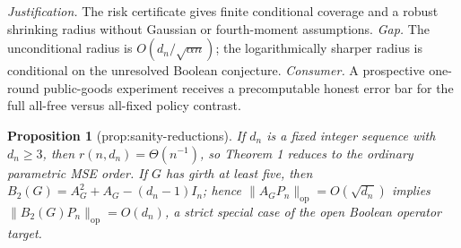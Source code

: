 \documentclass{article}
\newtheorem{proposition}{Proposition}
\begin{document}
\par\smallskip\noindent \textit{Justification.} The risk certificate gives finite conditional coverage and a robust shrinking radius without Gaussian or fourth-moment assumptions. \textit{Gap.} The unconditional radius is \(O(d_n/\sqrt{\alpha n})\); the logarithmically sharper radius is conditional on the unresolved Boolean conjecture. \textit{Consumer.} A prospective one-round public-goods experiment receives a precomputable honest error bar for the full all-free versus all-fixed policy contrast.

\begin{proposition}[prop:sanity-reductions]\label{prop:sanity-reductions}
If \(d_n\) is a fixed integer sequence with \(d_n\ge3\), then \(r(n,d_n)=\Theta(n^{-1})\), so Theorem 1 reduces to the ordinary parametric MSE order. If \(G\) has girth at least five, then \(B_2(G)=A_G^2+A_G-(d_n-1)I_n\); hence \(\|A_GP_n\|_{\mathrm{op}}=O(\sqrt{d_n})\) implies \(\|B_2(G)P_n\|_{\mathrm{op}}=O(d_n)\), a strict special case of the open Boolean operator target.
\end{proposition}
\end{document}
